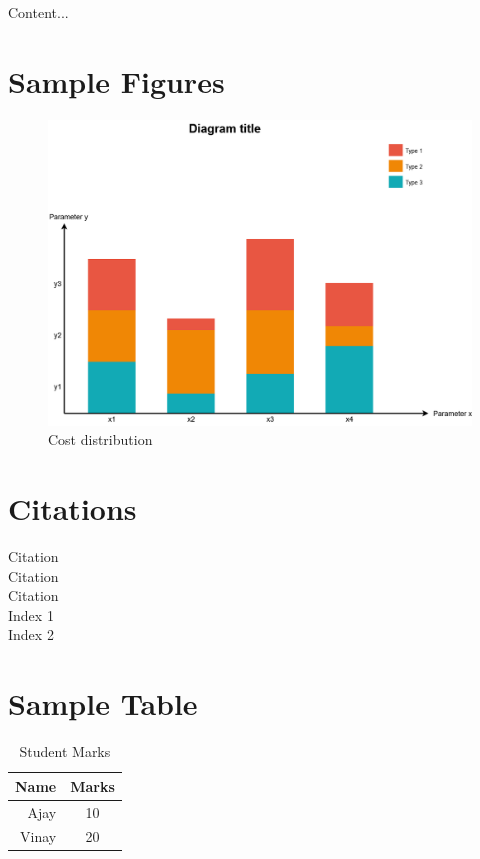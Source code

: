 
Content...

\section{Sample Figures}

\begin{figure}[h]
	\begin{center}
		\includegraphics[scale=0.3]{Figures/bargraph.png}
		\caption{Cost distribution}
		\label{fig:costdistribution}
	\end{center}
\end{figure}

\section{Citations}

Citation \cite{Venkataswamy2020} \\
Citation \cite{Kulkarni2017} \\
Citation \cite{Venkataswamy2019} \\

Index 1 \\
Index 2 \\

\section{Sample Table}

\begin{table}[h]
	\centering
	\caption{Student Marks}
	\begin{tabular}{|r|c|}
		\hline
		\textbf{Name}  & \textbf{Marks} \\
		\hline
		Ajay  & 10 \\
		Vinay & 20 \\
		\hline
	\end{tabular}%
	\label{tab:sm}%
\end{table}%


